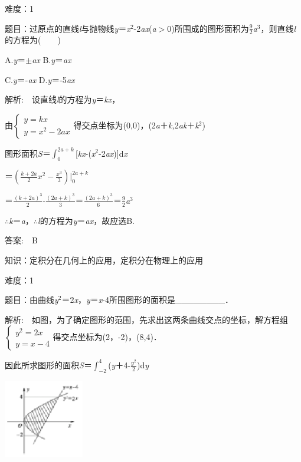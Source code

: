 \documentclass{article} %
\begin{document}
 难度：1

 题目：过原点的直线\textit{l}与抛物线\textit{y}＝\textit{x}${}^{2}$-2\textit{ax}(\textit{a}$\mathrm{>}$0)所围成的图形面积为$\frac{9}{2}$\textit{a}${}^{3}$，则直线\textit{l}的方程为(　　)

A.\textit{y}＝$\mathrm{\pm}$\textit{ax}       B.\textit{y}＝\textit{ax}

C.\textit{y}＝-\textit{ax}      D.\textit{y}＝-5\textit{ax}

 解析:　设直线\textit{l}的方程为\textit{y}＝\textit{kx}，

由$\left\{\begin{array}{r}y=kx\\y=x^2-2ax\end{array} \right.$得交点坐标为(0,0)，(2\textit{a}＋\textit{k,}2\textit{ak}＋\textit{k}${}^{2}$)

图形面积\textit{S}＝$\int_{0}^{2a+k}$[\textit{kx}-(\textit{x}${}^{2}$-2\textit{ax})]d\textit{x}

＝$(\frac{k+2a}{2}x^2-\frac{x^3}{3})|_0^{2a+k}$

＝$\frac{(k+2a)^3}{2}$-$\frac{(2a+k)^3}{3}$＝$\frac{(2a+k)^3}{6}$＝$\frac{9}{2}$\textit{a}${}^{3}$

$\mathrm{\therefore}$\textit{k}＝\textit{a}，$\mathrm{\therefore}$\textit{l}的方程为\textit{y}＝\textit{ax}，故应选B.

 答案:　B



 知识：定积分在几何上的应用，定积分在物理上的应用

 难度：1

 题目：由曲线\textit{y}${}^{2}$＝2\textit{x}，\textit{y}＝\textit{x}-4所围图形的面积是\_\_\_\_\_\_\_\_．

 解析:　如图，为了确定图形的范围，先求出这两条曲线交点的坐标，解方程组$\left\{\begin{array}{r}y^2=2x\\y=x-4\end{array} \right.$得交点坐标为(2，-2)，(8,4)．

因此所求图形的面积\textit{S}＝$\int_{-2}^{4}$(\textit{y}＋4-$\frac{y^2}{2}$)d\textit{y}

\includegraphics*[width=1.38in, height=1.35in, keepaspectratio=false]{image37}
\end{document}
